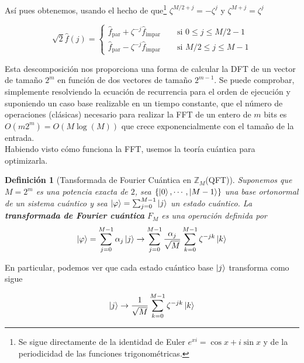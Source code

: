\documentclass[11pt, spanish]{report}
\numberwithin{equation}{section}
\newtheorem{defin}{Definición}[section]
\numberwithin{defin}{section}
\newenvironment{yellowBox}{\begin{tcolorbox}[colback=yellow!5!white,colframe=yellow!75!black]}{\end{tcolorbox}}
\begin{document}
Así pues obtenemos, usando el hecho de que\footnote{Se sigue directamente de la identidad de Euler $e^{xi}=\cos x + i\sin x$ y de la periodicidad de las funciones trigonométricas.} $\zeta^{M/2+j}=-\zeta^j$ y $\zeta^{M+j}=\zeta^j$

\begin{equation}
\sqrt{2}\hat{f}(j)=\begin{cases}
	\hat{f}_{\text{par}}+\zeta^{-j}\hat{f}_{\text{impar}}\qquad \text{si } 0\leq j\leq M/2-1\\
	\hat{f}_{\text{par}}-\zeta^{-j}\hat{f}_{\text{impar}}\qquad \text{si } M/2\leq j\leq M-1
\end{cases}
\end{equation}

Esta descomposición nos proporciona una forma de calcular la DFT de un vector de tamaño $2^m$ en función de dos vectores de tamaño $2^{m-1}$. Se puede comprobar, simplemente resolviendo la ecuación de recurrencia para el orden de ejecución y suponiendo un caso base realizable en un tiempo constante, que el número de operaciones (clásicas) necesario para realizar la FFT de un entero de $m$ bits es $O(m2^m)=O(M\log(M))$ que crece exponencialmente con el tamaño de la entrada.\\

Habiendo visto cómo funciona la FFT, usemos la teoría cuántica para optimizarla.\\


\begin{yellowBox}
\begin{defin}[Tansformada de Fourier Cuántica en $\mathbb{Z}_M$(QFT)] Suponemos que $M=2^m$ es una potencia exacta de $2$, sea $\{\ket{0},\cdots,\ket{M-1}\}$ una base ortonormal de un sistema cuántico y sea $\ket{\varphi}=\sum_{j=0}^{M-1}\ket{j}$ un estado cuántico. La \textbf{transformada de Fourier cuántica} $F_M$ es una operación definida por
\begin{equation}
\ket{\varphi}=\sum_{j=0}^{M-1}\alpha_j\ket{j}\rightarrow \sum_{j=0}^{M-1}\frac{\alpha_j}{\sqrt{M}}\sum_{k=0}^{M-1}\zeta^{-jk}\ket{k}
\end{equation}
\end{defin}
\end{yellowBox}

En particular, podemos ver que cada estado cuántico base $\ket{j}$ transforma como sigue\footnotemark{}

\begin{equation}
\ket{j}\rightarrow\frac{1}{\sqrt{M}}\sum_{k=0}^{M-1}\zeta^{-jk}\ket{k}
\end{equation}
\end{document}
